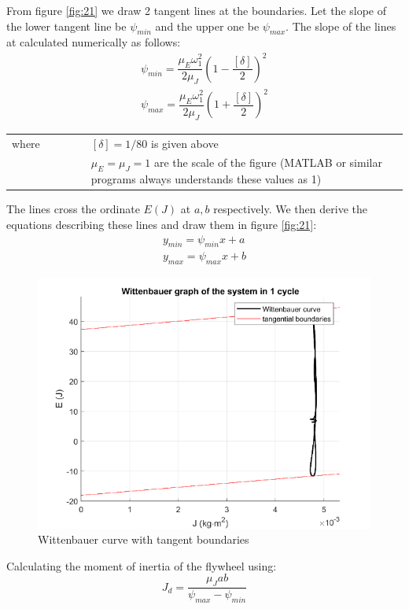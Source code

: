 From figure \ref{fig:21} we draw 2 tangent lines at the boundaries. Let the slope of the lower tangent line be $ \psi_{min} $ and the upper one be $ \psi_{max} $. The slope of the lines at calculated numerically as follows:
\begin{equation}
\begin{array}{c}
\psi_{min}=\dfrac{\mu_E\omega_1^2}{2\mu_J}\left(1-\dfrac{[\delta]}{2}\right)^2\\
\psi_{max}=\dfrac{\mu_E\omega_1^2}{2\mu_J}\left(1+\dfrac{[\delta]}{2}\right)^2
\end{array}
\end{equation}
\begin{tabular}{p{0.2\linewidth}p{0.8\linewidth}}
	where & $ [\delta]=1/80 $ is given above\\
	 & $ \mu_E=\mu_J =1$ are the scale of the figure (MATLAB\textup{\textregistered} or similar programs always understands these values as 1)
\end{tabular}

The lines cross the ordinate $ E(J) $ at $ a, b $ respectively. We then derive the equations describing these lines and draw them in figure \ref{fig:21}:
\begin{equation}
	\begin{array}{c}
	y_{min}=\psi_{min} x + a\\
	y_{max}=\psi_{max} x + b
	\end{array}
\end{equation}
\begin{figure}
	\centering
	\includegraphics[width=0.6\linewidth]{22}
	\caption{Wittenbauer curve with tangent boundaries}
	\label{fig:22}
\end{figure}

Calculating the moment of inertia of the flywheel using:
\begin{equation}
	J_d=\dfrac{\mu_J ab}{\psi_{max}-\psi_{min}}
\end{equation}

